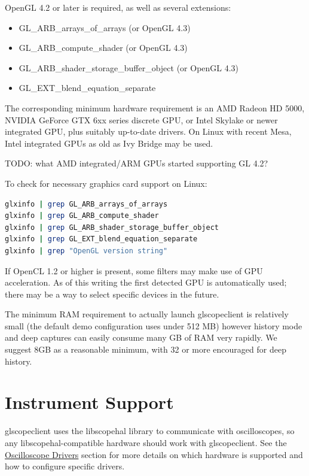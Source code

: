 OpenGL 4.2 or later is required, as well as several extensions:
\begin{itemize}
\item GL\_ARB\_arrays\_of\_arrays (or OpenGL 4.3)
\item GL\_ARB\_compute\_shader (or OpenGL 4.3)
\item GL\_ARB\_shader\_storage\_buffer\_object (or OpenGL 4.3)
\item GL\_EXT\_blend\_equation\_separate
\end{itemize}

The corresponding minimum hardware requirement is an AMD Radeon HD 5000, NVIDIA GeForce GTX 6xx series discrete GPU, or
Intel Skylake or newer integrated GPU, plus suitably up-to-date drivers. On Linux with recent Mesa, Intel integrated
GPUs as old as Ivy Bridge may be used.

TODO: what AMD integrated/ARM GPUs started supporting GL 4.2?

To check for necessary graphics card support on Linux:
\begin{lstlisting}[language=sh, numbers=none]
glxinfo | grep GL_ARB_arrays_of_arrays
glxinfo | grep GL_ARB_compute_shader
glxinfo | grep GL_ARB_shader_storage_buffer_object
glxinfo | grep GL_EXT_blend_equation_separate
glxinfo | grep "OpenGL version string"
\end{lstlisting}

If OpenCL 1.2 or higher is present, some filters may make use of GPU acceleration. As of this writing the first
detected GPU is automatically used; there may be a way to select specific devices in the future.

The minimum RAM requirement to actually launch glscopeclient is relatively small (the default demo configuration uses
under 512 MB) however history mode and deep captures can easily consume many GB of RAM very rapidly. We suggest 8GB as
a reasonable minimum, with 32 or more encouraged for deep history.

\section{Instrument Support}

glscopeclient uses the libscopehal library to communicate with oscilloscopes, so any libscopehal-compatible hardware
should work with glscopeclient. See the \hyperref[sec:drivers]{Oscilloscope Drivers} section for more details on which
hardware is supported and how to configure specific drivers.

